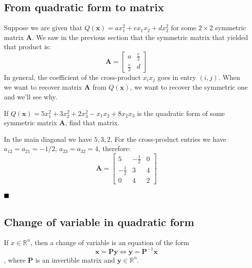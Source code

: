 \documentclass[a4paper]{article}
\numberwithin{equation}{section} %
\newcommand{\qedblack}{$\hfill\blacksquare$} %
\begin{document}
\subsection{From quadratic form to matrix}
Suppose we are given that $Q(\textbf{x})=ax_{1}^{2} + ex_{1}x_{2} + dx_{2}^{2}$ for some $2\times2$ symmetric matrix \textbf{A}. We saw in the previous section that the symmetric matrix that yielded that product is:
\begin{equation*}
  \textbf{A}=
  \begin{bmatrix}
      a & \tfrac{e}{2} \\
      \tfrac{e}{2} & d
  \end{bmatrix}
\end{equation*}
In general, the coefficient of the cross-product $x_{i}x_{j}$ goes in entry $(i,j)$. When we want to recover matrix $\textbf{A}$ from $Q(\textbf{x})$, we want to recover the symmetric one and we'll see why.
\begin{exmp}
  If $Q(\textbf{x})=5x_{1}^{2}+3x_{2}^{2}+2x_{3}^{2}-x_{1}x_{2}+8x_{2}x_{3}$ is the quadratic form of some symmetric matrix $\textbf{A}$, find that matrix.
\end{exmp}   
   \begin{TheSolution}
    In the main diagonal we have $5,3,2$, For the cross-product entries we have 	$a_{12}=a_{21}=-1/2$, $a_{23}=a_{32}=4$, therefore:
        \begin{equation*}
            \textbf{A}=
              \begin{bmatrix}
              5&		-\tfrac{1}{2}&		0\\
              -\tfrac{1}{2}&	3&			4\\
              0&		4&			2
              \end{bmatrix}
        \end{equation*}
    \end{TheSolution}
\qedblack


\subsection{Change of variable in quadratic form}

\begin{shaded*}
\begin{definition}
If $x\in \mathbb{R}^{n}$, then a change of variable is an equation of the form
\begin{equation}\label{eq:3}
	\textbf{x}=\textbf{P}\textbf{y} \Longleftrightarrow \textbf{y}=\textbf{P}^{-1}\textbf{x}
\end{equation}
, where $\textbf{P}$ is an invertible matrix and $\textbf{y}\in \mathbb{R}^{n}$.
\end{definition}
\end{shaded*}
\end{document}
